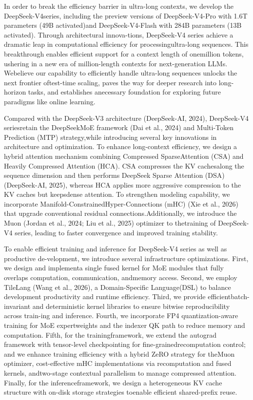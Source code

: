 \documentclass[
  10
]{article}
\begin{document}
In order to break the efficiency barrier in ultra-long contexts, we
develop the DeepSeek-V4series, including the preview versions of
DeepSeek-V4-Pro with 1.6T parameters (49B activated)and
DeepSeek-V4-Flash with 284B parameters (13B activated). Through
architectural innova-tions, DeepSeek-V4 series achieve a dramatic leap
in computational efficiency for processingultra-long sequences. This
breakthrough enables efficient support for a context length of
onemillion tokens, ushering in a new era of million-length contexts for
next-generation LLMs. Webelieve our capability to efficiently handle
ultra-long sequences unlocks the next frontier oftest-time scaling,
paves the way for deeper research into long-horizon tasks, and
establishes anecessary foundation for exploring future paradigms like
online learning.

Compared with the DeepSeek-V3 architecture (DeepSeek-AI, 2024),
DeepSeek-V4 seriesretain the DeepSeekMoE framework (Dai et al., 2024)
and Multi-Token Prediction (MTP) strategy,while introducing several key
innovations in architecture and optimization. To enhance long-context
efficiency, we design a hybrid attention mechanism combining Compressed
SparseAttention (CSA) and Heavily Compressed Attention (HCA). CSA
compresses the KV cachesalong the sequence dimension and then performs
DeepSeek Sparse Attention (DSA) (DeepSeek-AI, 2025), whereas HCA applies
more aggressive compression to the KV caches but keepsdense attention.
To strengthen modeling capability, we incorporate
Manifold-ConstrainedHyper-Connections (mHC) (Xie et al., 2026) that
upgrade conventional residual connections.Additionally, we introduce the
Muon (Jordan et al., 2024; Liu et al., 2025) optimizer to thetraining of
DeepSeek-V4 series, leading to faster convergence and improved training
stability.

To enable efficient training and inference for DeepSeek-V4 series as
well as productive de-velopment, we introduce several infrastructure
optimizations. First, we design and implementa single fused kernel for
MoE modules that fully overlaps computation, communication, andmemory
access. Second, we employ TileLang (Wang et al., 2026), a
Domain-Specific Language(DSL) to balance development productivity and
runtime efficiency. Third, we provide efficientbatch-invariant and
deterministic kernel libraries to ensure bitwise reproducibility across
train-ing and inference. Fourth, we incorporate FP4 quantization-aware
training for MoE expertweights and the indexer QK path to reduce memory
and computation. Fifth, for the trainingframework, we extend the
autograd framework with tensor-level checkpointing for
fine-grainedrecomputation control; and we enhance training efficiency
with a hybrid ZeRO strategy for theMuon optimizer, cost-effective mHC
implementations via recomputation and fused kernels, andtwo-stage
contextual parallelism to manage compressed attention. Finally, for the
inferenceframework, we design a heterogeneous KV cache structure with
on-disk storage strategies toenable efficient shared-prefix reuse.
\end{document}
